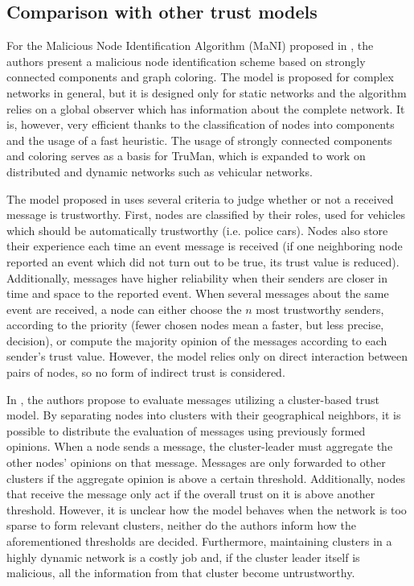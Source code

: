 \documentclass[conference]{IEEEtran}
\begin{document}
\subsection{Comparison with other trust models}
\label{section:comparison}

For the Malicious Node Identification Algorithm (MaNI) proposed in \cite{vernize2015malicious}, the authors present a malicious node identification scheme based on strongly connected components and graph coloring.
The model is proposed for complex networks in general, but it is designed only for static networks and the algorithm relies on a global observer which has information about the complete network.
It is, however, very efficient thanks to the classification of nodes into components and the usage of a fast heuristic.
The usage of strongly connected components and coloring serves as a basis for TruMan, which is expanded to work on distributed and dynamic networks such as vehicular networks.

The model proposed in \cite{minhas2010towards} uses several criteria to judge whether or not a received message is trustworthy.
First, nodes are classified by their roles, used for vehicles which should be automatically trustworthy (i.e. police cars).
Nodes also store their experience each time an event message is received (if one neighboring node reported an event which did not turn out to be true, its trust value is reduced).
Additionally, messages have higher reliability when their senders are closer in time and space to the reported event.
When several messages about the same event are received, a node can either choose the $n$ most trustworthy senders, according to the priority (fewer chosen nodes mean a faster, but less precise, decision), or compute the majority opinion of the messages according to each sender's trust value.
However, the model relies only on direct interaction between pairs of nodes, so no form of indirect trust is considered.

In \cite{chen2010trust}, the authors propose to evaluate messages utilizing a cluster-based trust model.
By separating nodes into clusters with their geographical neighbors, it is possible to distribute the evaluation of messages using previously formed opinions.
When a node sends a message, the cluster-leader must aggregate the other nodes' opinions on that message.
Messages are only forwarded to other clusters if the aggregate opinion is above a certain threshold. Additionally, nodes that receive the message only act if the overall trust on it is above another threshold.
However, it is unclear how the model behaves when the network is too sparse to form relevant clusters, neither do the authors inform how the aforementioned thresholds are decided.
Furthermore, maintaining clusters in a highly dynamic network is a costly job and, if the cluster leader itself is malicious, all the information from that cluster become untrustworthy.
\end{document}
